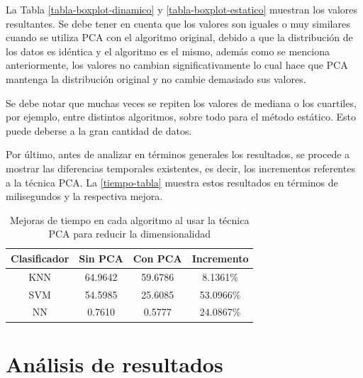 La Tabla \ref{tabla-boxplot-dinamico} y \ref{tabla-boxplot-estatico} muestran los valores resultantes. Se debe tener en cuenta que los valores son iguales o muy similares cuando se utiliza PCA con el algoritmo original, debido a que la distribución de los datos es idéntica y el algoritmo es el mismo, además como se menciona anteriormente, los valores no cambian significativamente lo cual hace que PCA mantenga la distribución original y no cambie demasiado sus valores.

Se debe notar que muchas veces se repiten los valores de mediana o los cuartiles, por ejemplo, entre distintos algoritmos, sobre todo para el método estático. Esto puede deberse a la gran cantidad de datos.

Por último, antes de analizar en términos generales los resultados, se procede a mostrar las diferencias temporales existentes, es decir, los incrementos referentes a la técnica PCA. La \autoref{tiempo-tabla} muestra estos resultados en términos de milisegundos y la respectiva mejora.


\begin{table}[ht!]
\centering
\caption[Mejoras de tiempo en cada algoritmo]{Mejoras de tiempo en cada algoritmo al usar la técnica PCA para reducir la dimensionalidad}
\label{tiempo-tabla}
\begin{tabular}{|c|c|c|c|}
\hline
\textbf{Clasificador} & \textbf{Sin PCA} & \textbf{Con PCA} & \textbf{Incremento} \\ \hline
KNN                   & 64.9642          & 59.6786          & 8.1361\%            \\ \hline
SVM                   & 54.5985          & 25.6085          & 53.0966\%           \\ \hline
NN                    & 0.7610           & 0.5777           & 24.0867\%           \\ \hline
\end{tabular}
\end{table}



\section{Análisis de resultados}

